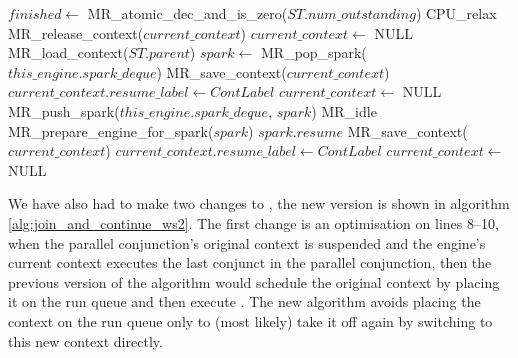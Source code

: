 \begin{algorithm}[tbp]
\begin{algorithmic}[1]
  \State $finished \gets$ MR\_atomic\_dec\_and\_is\_zero($ST.num\_outstanding$)
        \State CPU\_relax
      \EndWhile
      \State MR\_release\_context($current\_context$)
      \State $current\_context \gets$ NULL
      \State MR\_load\_context($ST.parent$)
    \EndIf
  \Else
    \State $spark \gets$ MR\_pop\_spark($this\_engine.spark\_deque$)
            \State MR\_save\_context($current\_context$)
            \State $current\_context.resume\_label \gets ContLabel$
            \State $current\_context \gets$ NULL
                \State MR\_push\_spark($this\_engine.spark\_deque$, $spark$)
                \Goto MR\_idle
            \EndIf
        \EndIf
        \State MR\_prepare\_engine\_for\_spark($spark$)
        \Goto $spark.resume$
    \Else
            \State MR\_save\_context($current\_context$)
            \State $current\_context.resume\_label \gets ContLabel$
            \State $current\_context \gets$ NULL
        \EndIf
    \EndIf
  \EndIf
\EndProcedure
\end{algorithmic}
\caption{\joinandcontinue}
\label{alg:join_and_continue_ws2}
\end{algorithm}

We have also had to make two changes to \joinandcontinue,
the new version is shown in algorithm \ref{alg:join_and_continue_ws2}.
The first change is an optimisation on lines 8--10,
when the parallel conjunction's original context is suspended
and the engine's current context executes the last conjunct in the parallel
conjunction,
then the previous version of the algorithm would schedule the original
context by placing it on the run queue and then execute \idle.
The new algorithm avoids placing the context on the run queue only to (most
likely) take it off again by switching to this new context directly.

